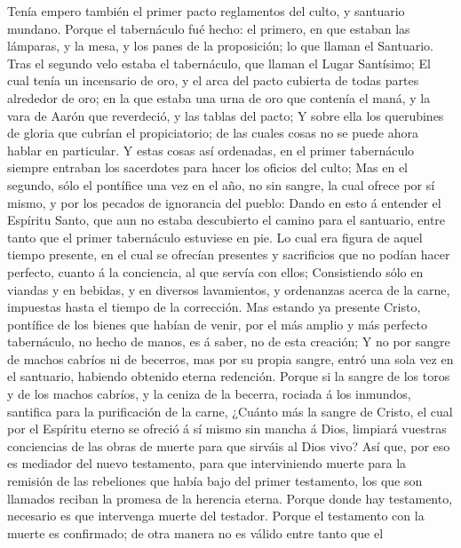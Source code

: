  Tenía empero también el primer pacto reglamentos del culto,
y santuario mundano.  Porque el tabernáculo fué hecho: el
primero, en que estaban las lámparas, y la mesa, y los panes de la
proposición; lo que llaman el Santuario.  Tras el segundo
velo estaba el tabernáculo, que llaman el Lugar Santísimo; 
El cual tenía un incensario de oro, y el arca del pacto cubierta de
todas partes alrededor de oro; en la que estaba una urna de oro que
contenía el maná, y la vara de Aarón que reverdeció, y las tablas del
pacto;  Y sobre ella los querubines de gloria que cubrían el
propiciatorio; de las cuales cosas no se puede ahora hablar en
particular.  Y estas cosas así ordenadas, en el primer
tabernáculo siempre entraban los sacerdotes para hacer los oficios del
culto;  Mas en el segundo, sólo el pontífice una vez en el
año, no sin sangre, la cual ofrece por sí mismo, y por los pecados de
ignorancia del pueblo:  Dando en esto á entender el Espíritu
Santo, que aun no estaba descubierto el camino para el santuario, entre
tanto que el primer tabernáculo estuviese en pie.  Lo cual
era figura de aquel tiempo presente, en el cual se ofrecían presentes y
sacrificios que no podían hacer perfecto, cuanto á la conciencia, al que
servía con ellos;  Consistiendo sólo en viandas y en
bebidas, y en diversos lavamientos, y ordenanzas acerca de la carne,
impuestas hasta el tiempo de la corrección.  Mas estando ya
presente Cristo, pontífice de los bienes que habían de venir, por el más
amplio y más perfecto tabernáculo, no hecho de manos, es á saber, no de
esta creación;  Y no por sangre de machos cabríos ni de
becerros, mas por su propia sangre, entró una sola vez en el santuario,
habiendo obtenido eterna redención.  Porque si la sangre de
los toros y de los machos cabríos, y la ceniza de la becerra, rociada á
los inmundos, santifica para la purificación de la carne, 
¿Cuánto más la sangre de Cristo, el cual por el Espíritu eterno se
ofreció á sí mismo sin mancha á Dios, limpiará vuestras conciencias de
las obras de muerte para que sirváis al Dios vivo?  Así
que, por eso es mediador del nuevo testamento, para que interviniendo
muerte para la remisión de las rebeliones que había bajo del primer
testamento, los que son llamados reciban la promesa de la herencia
eterna.  Porque donde hay testamento, necesario es que
intervenga muerte del testador.  Porque el testamento con
la muerte es confirmado; de otra manera no es válido entre tanto que el
